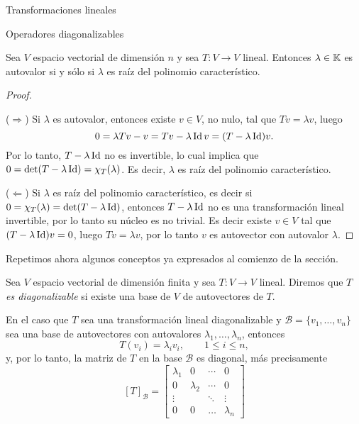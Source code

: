 \begin{chapter}{Transformaciones lineales}
\begin{section}{Operadores diagonalizables}
        
        \begin{proposicion}\label{autovalores}
            Sea $V$ espacio vectorial de dimensión $n$ y sea $T: V \to V$ lineal. Entonces $\lambda\in \mathbb K$ es autovalor si y sólo si $\lambda$ es raíz del polinomio característico.  
        \end{proposicion}
        \begin{proof}${}^{}$
            
            ($\Rightarrow$) Si $\lambda$ es autovalor, entonces existe $v \in V$, no nulo, tal que $Tv = \lambda v$, luego 
            $$
            0 = \lambda Tv -v  =   Tv - \lambda \operatorname{Id} v =  (T-\lambda \operatorname{Id})v.
            $$
            Por lo tanto, $T-\lambda \operatorname{Id}$ no es invertible, lo cual implica que $0 = \det(T-\lambda \operatorname{Id}) = \chi_T(\lambda)$. Es decir, $\lambda$ es raíz del polinomio característico. 
            
            ($\Leftarrow$) Si $\lambda$ es raíz del polinomio característico, es decir si $0 = \chi_T(\lambda) = \det(T-\lambda \operatorname{Id})$, entonces $T-\lambda \operatorname{Id}$ no es una transformación lineal  invertible, por lo tanto  su núcleo es no trivial. Es decir existe $v \in V$ tal que $(T-\lambda \operatorname{Id})v =0$, luego $Tv =\lambda v$, por lo tanto $v$ es autovector con autovalor $\lambda$.   
        \end{proof}
        
        Repetimos ahora algunos conceptos ya expresados al comienzo de la sección. 
        
        \begin{definicion}
            Sea $V$ espacio vectorial de dimensión finita y sea $T: V \to V$ lineal. Diremos que \textit{$T$ es diagonalizable} si existe una base de $V$ de autovectores de $T$. 
        \end{definicion}	
        
        En el caso que $T$ sea una transformación lineal diagonalizable y $\mathcal{B} = \{v_1,\ldots,v_n \}$ sea una base de autovectores con autovalores $\lambda_1,\ldots,\lambda_n$, entonces
        $$
        T(v_i) = \lambda_i v_i, \qquad 1 \le i \le n,
        $$ 
        y, por lo tanto, la matriz de $T$ en  la base $\mathcal{B}$ es diagonal, más precisamente
        $$
        [T]_\mathcal{B} = \begin{bmatrix}
        \lambda_1 &0 & \cdots & 0 \\
        0 & \lambda_2 & \cdots &0 \\
        \vdots & &\ddots & \vdots \\
        0 & 0 & \ldots &\lambda_n
        \end{bmatrix}
        $$
        

\end{section}
\end{chapter}
